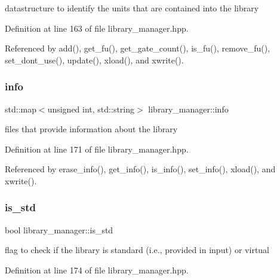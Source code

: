 datastructure to identify the units that are contained into the library 



Definition at line 163 of file library\+\_\+manager.\+hpp.



Referenced by add(), get\+\_\+fu(), get\+\_\+gate\+\_\+count(), is\+\_\+fu(), remove\+\_\+fu(), set\+\_\+dont\+\_\+use(), update(), xload(), and xwrite().

\mbox{\label{classlibrary__manager_a1dbe9b8f22a6e8f19086159723bfb0a6}} 
\subsubsection{\texorpdfstring{info}{info}}
{\footnotesize\ttfamily std\+::map$<$unsigned int, std\+::string$>$ library\+\_\+manager\+::info\hspace{0.3cm}{\ttfamily [private]}}



files that provide information about the library 



Definition at line 171 of file library\+\_\+manager.\+hpp.



Referenced by erase\+\_\+info(), get\+\_\+info(), is\+\_\+info(), set\+\_\+info(), xload(), and xwrite().

\mbox{\label{classlibrary__manager_a9b6c57463b3f9c936b5907b51b6487e1}} 
\subsubsection{\texorpdfstring{is\+\_\+std}{is\_std}}
{\footnotesize\ttfamily bool library\+\_\+manager\+::is\+\_\+std\hspace{0.3cm}{\ttfamily [private]}}



flag to check if the library is standard (i.\+e., provided in input) or virtual 



Definition at line 174 of file library\+\_\+manager.\+hpp.



